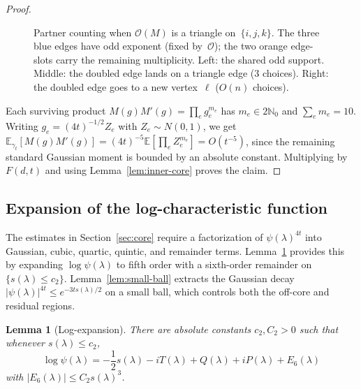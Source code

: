 \documentclass[11pt]{article}
\newtheorem{lemma}[theorem]{Lemma}
\theoremstyle{definition}
\newcommand{\E}{\mathbb{E}}
\begin{document}
\begin{proof}
\begin{figure}[ht]
\begin{tikzpicture}[
  vtx/.style={circle, fill=black, inner sep=1.8pt},
  edge/.style={line width=0.7pt},
  oddedge/.style={line width=0.7pt, blue!70},
  doubledge/.style={line width=0.7pt, orange!80!black},
]
\end{tikzpicture}
\caption{Partner counting when \(\mathcal O(M)\) is a triangle on~\(\{i,j,k\}\).
The three blue edges have odd exponent (fixed by~\(\mathcal O\)); the two orange edge-slots carry the remaining multiplicity.
Left: the shared odd support.
Middle: the doubled edge lands on a triangle edge (\(3\) choices).
Right: the doubled edge goes to a new vertex~\(\ell\) (\(O(n)\) choices).}
\label{fig:triangle-partners}
\end{figure}

Each surviving product \(M(g)M'(g)=\prod_e g_e^{m_e}\) has \(m_e\in 2\mathbb N_0\) and \(\sum_e m_e=10\). Writing \(g_e=(4t)^{-1/2}Z_e\) with \(Z_e\sim N(0,1)\), we get \(\E_{\gamma_t}[M(g)M'(g)]=(4t)^{-5}\E[\prod_e Z_e^{m_e}]=O(t^{-5})\), since the remaining standard Gaussian moment is bounded by an absolute constant. Multiplying by \(F(d,t)\) and using Lemma~\ref{lem:inner-core} proves the claim.
\end{proof}

\subsection{Expansion of the log-characteristic function}

The estimates in Section~\ref{sec:core} require a factorization of \(\psi(\lambda)^{4t}\) into Gaussian, cubic, quartic, quintic, and remainder terms. Lemma~\ref{lem:sixth} provides this by expanding \(\log\psi(\lambda)\) to fifth order with a sixth-order remainder on \(\{s(\lambda)\le c_2\}\). Lemma~\ref{lem:small-ball} extracts the Gaussian decay \(|\psi(\lambda)|^{4t}\le e^{-3ts(\lambda)/2}\) on a small ball, which controls both the off-core and residual regions.

\begin{lemma}[Log-expansion]\label{lem:sixth}
There are absolute constants \(c_2,C_2>0\) such that whenever \(s(\lambda)\le c_2\),
\[
  \log\psi(\lambda)
  =-\frac12 s(\lambda)-iT(\lambda)+Q(\lambda)+iP(\lambda)+E_6(\lambda)
\]
with \(|E_6(\lambda)|\le C_2 s(\lambda)^3\).
\end{lemma}
\end{document}

